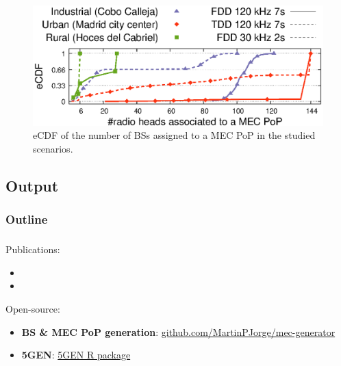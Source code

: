\documentclass[aspectratio=169]{beamer}
\begin{document}
\begin{frame}

    \frametitle{\secname}
    \framesubtitle{\subsecname}

    \begin{figure}[t]
        \centering
        \includegraphics[width=.8\columnwidth]{img/cdfs}
        \vspace{1em}
        \caption{eCDF of the number of BSs assigned to a MEC PoP in the studied scenarios.}
        \label{fig:cdfs}
    \end{figure}
\end{frame}


\subsection{Output}
\begin{frame}
    \frametitle{Outline}
    \tableofcontents[subsectionstyle=show/shaded/hide,sectionstyle=show/shaded]
\end{frame}

\begin{frame}
    \frametitle{\secname}
    \framesubtitle{\subsecname}
    Publications:
    \begin{itemize}
        \item {}
        \item {}
    \end{itemize}
    Open-source:
    \begin{itemize}
        \item \textbf{BS \& MEC PoP generation}: \url{github.com/MartinPJorge/mec-generator}
        \item \textbf{5GEN}: \href{https://github.com/MartinPJorge/mec-generator/tree/5g-infra-gen}{5GEN R package}
    \end{itemize}
    

\end{frame}
\end{document}
